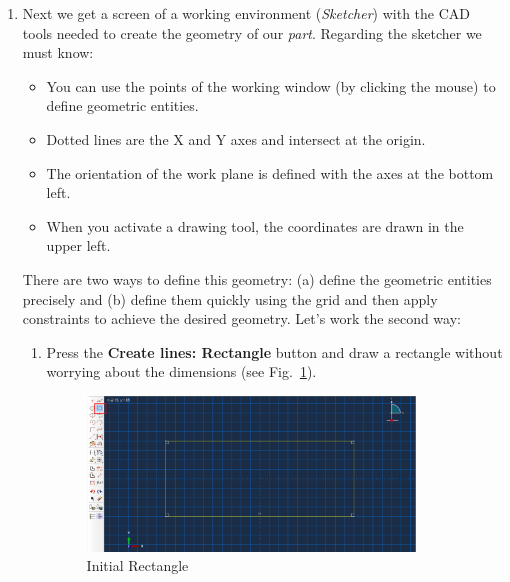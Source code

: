 \begin{enumerate}
\item Next we get a screen of a working environment
  (\textit{Sketcher}) with the CAD tools needed to create the geometry
  of our \textit{part}. Regarding the sketcher we must know:
  \begin{itemize}
  \item You can use the points of the working window (by clicking the
    mouse) to define geometric entities.
  \item Dotted lines are the X and Y axes and intersect at the origin.
  \item The orientation of the work plane is defined with the axes at
    the bottom left.
  \item When you activate a drawing tool, the coordinates are drawn in
    the upper left.
  \end{itemize}

  There are two ways to define this geometry: (a) define the geometric
  entities precisely and (b) define them quickly using the grid and
  then apply constraints to achieve the desired geometry. Let's work
  the second way:
  \begin{enumerate}
  \item Press the \textbf{Create lines: Rectangle} button and draw a
    rectangle without worrying about the dimensions (see
    Fig.~\ref{figu05}).
    \begin{figure}[!h]
      \begin{center}
        \includegraphics[width=0.875\textwidth]{./body/images/imagen05.pdf}
      \end{center}
      \caption{Initial Rectangle}
      \label{figu05}
    \end{figure}


\end{enumerate}
\end{enumerate}
